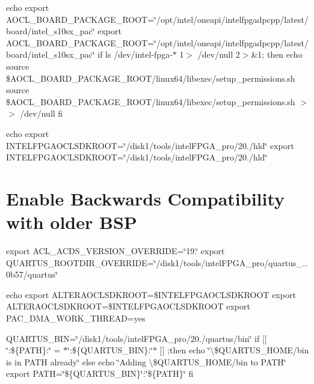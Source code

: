 echo export A\-O\-C\-L\-\_\-\-B\-O\-A\-R\-D\-\_\-\-P\-A\-C\-K\-A\-G\-E\-\_\-\-R\-O\-O\-T=\char`\"{}/opt/intel/oneapi/intelfpgadpcpp/latest/board/intel\-\_\-s10sx\-\_\-pac\char`\"{} export A\-O\-C\-L\-\_\-\-B\-O\-A\-R\-D\-\_\-\-P\-A\-C\-K\-A\-G\-E\-\_\-\-R\-O\-O\-T=\char`\"{}/opt/intel/oneapi/intelfpgadpcpp/latest/board/intel\-\_\-s10sx\-\_\-pac\char`\"{} if ls /dev/intel-\/fpga-\/$\ast$ 1$>$ /dev/null 2$>$\&1; then echo source \$\-A\-O\-C\-L\-\_\-\-B\-O\-A\-R\-D\-\_\-\-P\-A\-C\-K\-A\-G\-E\-\_\-\-R\-O\-O\-T/linux64/libexec/setup\-\_\-permissions.sh source \$\-A\-O\-C\-L\-\_\-\-B\-O\-A\-R\-D\-\_\-\-P\-A\-C\-K\-A\-G\-E\-\_\-\-R\-O\-O\-T/linux64/libexec/setup\-\_\-permissions.sh $>$$>$ /dev/null fi

echo export I\-N\-T\-E\-L\-F\-P\-G\-A\-O\-C\-L\-S\-D\-K\-R\-O\-O\-T=\char`\"{}/disk1/tools/intel\-F\-P\-G\-A\-\_\-pro/20./hld\char`\"{} export I\-N\-T\-E\-L\-F\-P\-G\-A\-O\-C\-L\-S\-D\-K\-R\-O\-O\-T=\char`\"{}/disk1/tools/intel\-F\-P\-G\-A\-\_\-pro/20./hld\char`\"{}

\section*{Enable Backwards Compatibility with older B\-S\-P}

export A\-C\-L\-\_\-\-A\-C\-D\-S\-\_\-\-V\-E\-R\-S\-I\-O\-N\-\_\-\-O\-V\-E\-R\-R\-I\-D\-E=\char`\"{}19.\char`\"{} export Q\-U\-A\-R\-T\-U\-S\-\_\-\-R\-O\-O\-T\-D\-I\-R\-\_\-\-O\-V\-E\-R\-R\-I\-D\-E=\char`\"{}/disk1/tools/intel\-F\-P\-G\-A\-\_\-pro/quartus\-\_..\-0b57/quartus\char`\"{}

echo export A\-L\-T\-E\-R\-A\-O\-C\-L\-S\-D\-K\-R\-O\-O\-T=\$\-I\-N\-T\-E\-L\-F\-P\-G\-A\-O\-C\-L\-S\-D\-K\-R\-O\-O\-T export A\-L\-T\-E\-R\-A\-O\-C\-L\-S\-D\-K\-R\-O\-O\-T=\$\-I\-N\-T\-E\-L\-F\-P\-G\-A\-O\-C\-L\-S\-D\-K\-R\-O\-O\-T export P\-A\-C\-\_\-\-D\-M\-A\-\_\-\-W\-O\-R\-K\-\_\-\-T\-H\-R\-E\-A\-D=yes

Q\-U\-A\-R\-T\-U\-S\-\_\-\-B\-I\-N=\char`\"{}/disk1/tools/intel\-F\-P\-G\-A\-\_\-pro/20./quartus/bin\char`\"{} if \mbox{[}\mbox{[} \char`\"{}\-:\$\{\-P\-A\-T\-H\}\-:\char`\"{} = $\ast$\char`\"{}\-:\$\{\-Q\-U\-A\-R\-T\-U\-S\-\_\-\-B\-I\-N\}\-:\char`\"{}$\ast$ \mbox{]}\mbox{]} ;then echo \char`\"{}\textbackslash{}\$\-Q\-U\-A\-R\-T\-U\-S\-\_\-\-H\-O\-M\-E/bin is in P\-A\-T\-H already\char`\"{} else echo \char`\"{}\-Adding \textbackslash{}\$\-Q\-U\-A\-R\-T\-U\-S\-\_\-\-H\-O\-M\-E/bin to P\-A\-T\-H\char`\"{} export P\-A\-T\-H=\char`\"{}\$\{\-Q\-U\-A\-R\-T\-U\-S\-\_\-\-B\-I\-N\}\char`\"{}\-:\char`\"{}\$\{\-P\-A\-T\-H\}\char`\"{} fi

